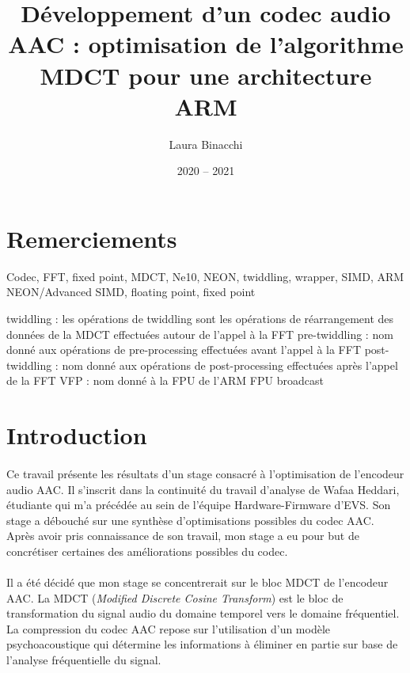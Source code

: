 \documentclass{article}
\title{Développement d'un codec audio AAC : optimisation de l'algorithme MDCT pour une architecture ARM}
\date{2020 -- 2021}
\author{Laura Binacchi}
\begin{document}
    
    \newpage
    \section*{Remerciements}




    \newpage
    \tableofcontents
    \newpage
    \listoffigures

    \newpage
    \printglossary[toctitle=\protect\numberline{}Glossaire]
    Codec, FFT, fixed point, MDCT, Ne10, NEON, twiddling, wrapper, SIMD, ARM NEON/Advanced SIMD, floating point, fixed point

    twiddling : les opérations de twiddling sont les opérations de réarrangement des données de la MDCT effectuées autour de l'appel à la FFT
    pre-twiddling : nom donné aux opérations de pre-processing effectuées avant l'appel à la FFT
    post-twiddling : nom donné aux opérations de post-processing effectuées après l'appel de la FFT
    VFP : nom donné à la FPU de l'ARM
    FPU
    broadcast

    \newpage
    \section*{Introduction}

    \paragraph{}
    Ce travail présente les résultats d'un stage consacré à l'optimisation de l'encodeur audio AAC. Il s'inscrit dans la continuité du travail d'analyse de Wafaa Heddari, étudiante qui m'a précédée au sein de l'équipe Hardware-Firmware d'EVS. Son stage a débouché sur une synthèse d'optimisations possibles du codec AAC. Après avoir pris connaissance de son travail, mon stage a eu pour but de concrétiser certaines des améliorations possibles du codec.

    \paragraph{}
    Il a été décidé que mon stage se concentrerait sur le bloc MDCT de l'encodeur AAC. La MDCT (\emph{Modified Discrete Cosine Transform}) est le bloc de transformation du signal audio du domaine temporel vers le domaine fréquentiel. La compression du codec AAC repose sur l'utilisation d'un modèle psychoacoustique qui détermine les informations à éliminer en partie sur base de l'analyse fréquentielle du signal.
\end{document}
